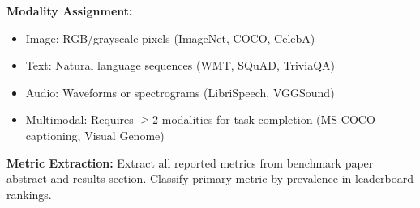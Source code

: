 \textbf{Modality Assignment:}
\begin{itemize}
\item Image: RGB/grayscale pixels (ImageNet, COCO, CelebA)
\item Text: Natural language sequences (WMT, SQuAD, TriviaQA)
\item Audio: Waveforms or spectrograms (LibriSpeech, VGGSound)
\item Multimodal: Requires $\geq 2$ modalities for task completion (MS-COCO captioning, Visual Genome)
\end{itemize}

\textbf{Metric Extraction:}
Extract all reported metrics from benchmark paper abstract and results section. Classify primary metric by prevalence in leaderboard rankings.

